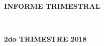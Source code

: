\begin{titlepage}
\begin{center}
\vspace*{2in}
\begin{Huge}
\textbf{INFORME TRIMESTRAL}
\end{Huge} \\
\vspace*{1in}
\begin{Large}
\textbf{2do TRIMESTRE 2018}
\end{Large}
\end{center}
\end{titlepage}
